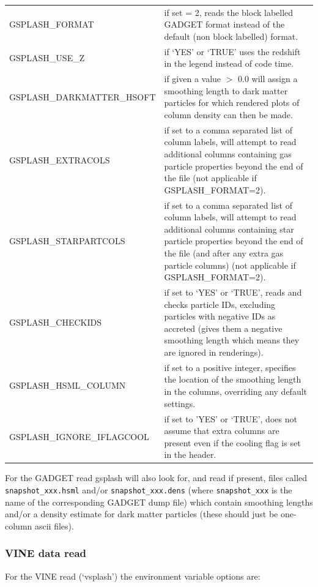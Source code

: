 \documentclass[a4paper,10pt]{article}
\begin{document}
\begin{tabular}{p{}p{}}
GSPLASH\_FORMAT & if set = 2, reads the block labelled GADGET format instead of the default (non block labelled) format. \\
GSPLASH\_USE\_Z & if `YES' or `TRUE' uses the redshift in the legend instead of code time. \\
GSPLASH\_DARKMATTER\_HSOFT & if given a value $>$ 0.0 will assign a smoothing length to dark matter particles for which rendered plots of column density can then be made. \\
GSPLASH\_EXTRACOLS & if set to a comma separated list of column labels, will attempt to read additional columns containing gas particle properties beyond the end of the file (not applicable if GSPLASH\_FORMAT=2). \\
GSPLASH\_STARPARTCOLS & if set to a comma separated list of column labels, will attempt to read additional columns containing star particle properties beyond the end of the file (and after any extra gas particle columns) (not applicable if GSPLASH\_FORMAT=2). \\
GSPLASH\_CHECKIDS & if set to `YES' or `TRUE', reads and checks particle IDs, excluding particles with negative IDs as accreted (gives them a negative smoothing length which means they are ignored in renderings). \\
GSPLASH\_HSML\_COLUMN & if set to a positive integer, specifies the location of the smoothing length in the columns, overriding any default settings. \\
GSPLASH\_IGNORE\_IFLAGCOOL & if set to 'YES' or `TRUE', does not assume that extra columns are present even if the cooling flag is set in the header. \\
\end{tabular}

 For the GADGET read gsplash will also look for, and read if present, files called \verb+snapshot_xxx.hsml+ and/or \verb+snapshot_xxx.dens+ (where \verb+snapshot_xxx+ is the name of the corresponding GADGET dump file) which contain smoothing lengths and/or a density estimate for dark matter particles (these should just be one-column ascii files).

\subsubsection{ VINE data read}
 For the VINE read (`vsplash') the environment variable options are:\newline
\end{document}
